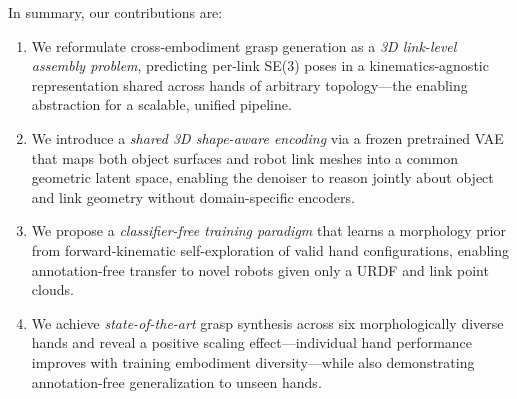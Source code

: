 \noindent In summary, our contributions are:
\begin{enumerate}
    \item We reformulate cross-embodiment grasp generation as a \emph{3D link-level assembly problem}, predicting per-link SE(3) poses in a kinematics-agnostic representation shared across hands of arbitrary topology---the enabling abstraction for a scalable, unified pipeline.
    \item We introduce a \emph{shared 3D shape-aware encoding} via a frozen pretrained VAE that maps both object surfaces and robot link meshes into a common geometric latent space, enabling the denoiser to reason jointly about object and link geometry without domain-specific encoders.
    \item We propose a \emph{classifier-free training paradigm} that learns a morphology prior from forward-kinematic self-exploration of valid hand configurations, enabling annotation-free transfer to novel robots given only a URDF and link point clouds.
    \item We achieve \emph{state-of-the-art} grasp synthesis across six morphologically diverse hands and reveal a positive scaling effect---individual hand performance improves with training embodiment diversity---while also demonstrating annotation-free generalization to unseen hands.
\end{enumerate}
